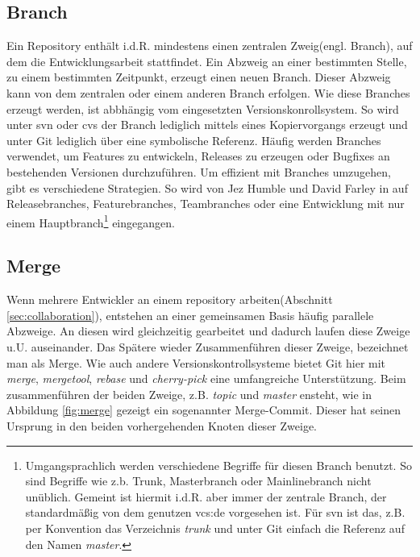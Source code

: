 \subsection{Branch}\label{sec:branch}
Ein Repository enthält i.d.R. mindestens einen zentralen Zweig(engl. Branch), auf dem
die Entwicklungsarbeit stattfindet. Ein Abzweig an einer bestimmten Stelle, zu
einem bestimmten Zeitpunkt, erzeugt einen neuen Branch. Dieser Abzweig kann von
dem zentralen oder einem anderen Branch erfolgen. Wie diese Branches erzeugt
werden, ist abbhängig vom eingesetzten Versionskonrollsystem. So wird unter
\acrshort{svn} oder \acrshort{cvs} der Branch lediglich mittels eines Kopiervorgangs
erzeugt und unter Git lediglich
über eine symbolische Referenz. Häufig werden Branches verwendet, um Features zu
entwickeln, Releases zu erzeugen oder Bugfixes an bestehenden Versionen
durchzuführen\cite[S.~21]{gitosp}. Um effizient mit Branches umzugehen, gibt es
verschiedene Strategien. So wird von Jez Humble und David Farley in
\cite[S.~408-412]{cd} auf Releasebranches, Featurebranches, Teambranches oder
eine Entwicklung mit nur einem Hauptbranch\footnote{Umgangsprachlich werden
verschiedene Begriffe für diesen Branch benutzt. So sind Begriffe wie z.b.
Trunk, Masterbranch oder Mainlinebranch nicht unüblich. Gemeint ist hiermit
i.d.R. aber immer der zentrale Branch, der standardmäßig von dem genutzen
\acrlong{vcs:de} vorgesehen ist. Für \acrshort{svn} ist das, z.B. per Konvention
das Verzeichnis \textit{trunk} und unter Git einfach die Referenz auf den Namen
\textit{master}.} eingegangen.

\subsection{Merge}\label{sec:merge}
Wenn mehrere Entwickler an einem \gls{repository} arbeiten(Abschnitt
\ref{sec:collaboration}), entstehen an einer gemeinsamen Basis häufig parallele
Abzweige. An diesen wird gleichzeitig gearbeitet und dadurch laufen diese
Zweige u.U. auseinander. Das Spätere wieder Zusammenführen dieser Zweige,
bezeichnet man als Merge. Wie auch andere Versionskontrollsysteme bietet Git
hier mit \textit{merge}, \textit{mergetool}, \textit{rebase} und
\textit{cherry-pick} eine umfangreiche Unterstützung\cite[S.~vii]{gitwf}. Beim
zusammenführen der beiden Zweige, z.B.  \textit{topic} und \textit{master}
ensteht, wie in Abbildung \ref{fig:merge} gezeigt ein sogenannter Merge-Commit.
Dieser hat seinen Ursprung in den beiden vorhergehenden Knoten dieser Zweige.

